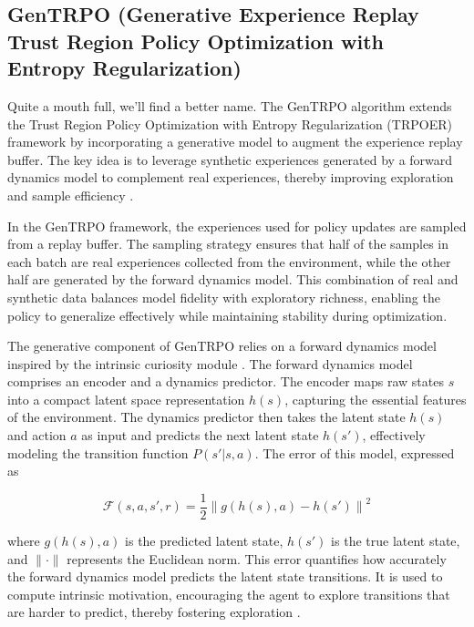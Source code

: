 \documentclass{svproc}
\begin{document}
\subsection{GenTRPO (Generative Experience Replay Trust Region Policy Optimization with Entropy Regularization)}

Quite a mouth full, we'll find a better name. The GenTRPO algorithm extends the Trust Region Policy Optimization with Entropy Regularization (TRPOER) framework \cite{schulman2017proximalpolicyoptimizationalgorithms,schulman2017trustregionpolicyoptimization} by incorporating a generative model to augment the experience replay buffer. The key idea is to leverage synthetic experiences generated by a forward dynamics model to complement real experiences, thereby improving exploration and sample efficiency \cite{pathak2017curiositydrivenexplorationselfsupervisedprediction}. 

In the GenTRPO framework, the experiences used for policy updates are sampled from a replay buffer. The sampling strategy ensures that half of the samples in each batch are real experiences collected from the environment, while the other half are generated by the forward dynamics model. This combination of real and synthetic data balances model fidelity with exploratory richness, enabling the policy to generalize effectively while maintaining stability during optimization.

The generative component of GenTRPO relies on a forward dynamics model inspired by the intrinsic curiosity module \cite{pathak2017curiositydrivenexplorationselfsupervisedprediction}. The forward dynamics model comprises an encoder and a dynamics predictor. The encoder maps raw states \( s \) into a compact latent space representation \( h(s) \), capturing the essential features of the environment. The dynamics predictor then takes the latent state \( h(s) \) and action \( a \) as input and predicts the next latent state \( h(s') \), effectively modeling the transition function \( P(s' | s, a) \). The error of this model, expressed as 

\begin{equation}
  \mathcal{F}(s, a, s', r) = \frac{1}{2} \left\| g(h(s), a) - h(s') \right\|^2
\end{equation}

where \( g(h(s), a) \) is the predicted latent state, \( h(s') \) is the true latent state, and \( \| \cdot \| \) represents the Euclidean norm. This error quantifies how accurately the forward dynamics model predicts the latent state transitions. It is used to compute intrinsic motivation, encouraging the agent to explore transitions that are harder to predict, thereby fostering exploration  \cite{wang2024prioritizedgenerativereplay}.
\end{document}
